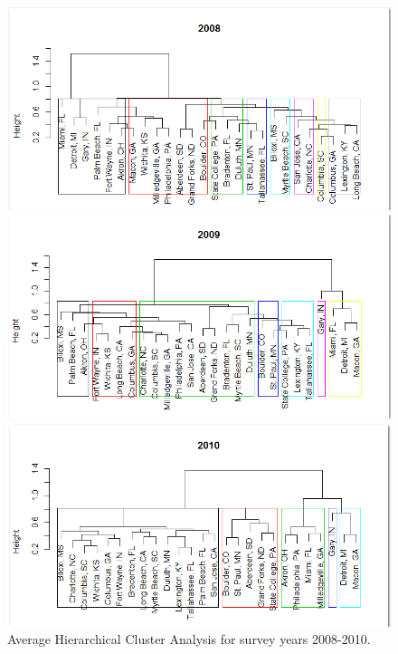 \documentclass[11pt]{asaproc}
\begin{document}
\begin{figure}[H]
\begin{framed}
\begin{minipage}[b]{0.45\linewidth}
\centering
\includegraphics[width=\textwidth]{cluster08.png}
\end{minipage}
\hspace{0.5cm}
\begin{minipage}[b]{0.45\linewidth}
\centering
\includegraphics[width=\textwidth]{cluster09.png}
\end{minipage}
\hspace{0.5cm}
\begin{minipage}[b]{0.45\linewidth}
\centering
\includegraphics[width=\textwidth]{cluster10.png}
\end{minipage}
\hspace{0.5cm}
\begin{minipage}[b]{0.45\linewidth}
\centering
\caption{Average Hierarchical Cluster Analysis for survey years
  2008-2010.}
\label{fig:HCA}
\end{minipage}
\end{framed}
\end{figure}
\end{document}
